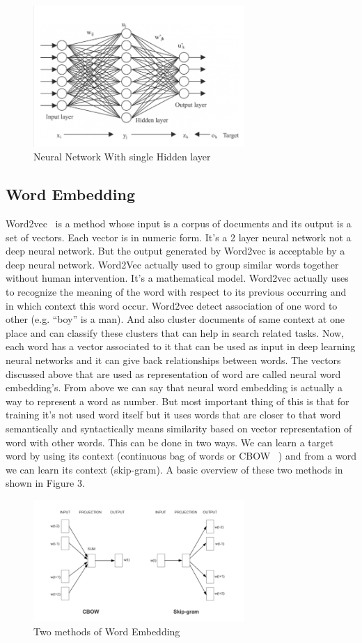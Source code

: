 \documentclass{doublecol-new}
\theoremstyle{TH}{
\newtheorem{lemma}{Lemma}
\newtheorem{theorem}[lemma]{Theorem}
\newtheorem{corrolary}[lemma]{Corrolary}
\newtheorem{conjecture}[lemma]{Conjecture}
\newtheorem{proposition}[lemma]{Proposition}
\newtheorem{claim}[lemma]{Claim}
\newtheorem{stheorem}[lemma]{Wrong Theorem}
\newtheorem{algorithm}{Algorithm}
}
\theoremstyle{THrm}{
\newtheorem{definition}{Definition}[section]
\newtheorem{question}{Question}[section]
\newtheorem{remark}{Remark}
\newtheorem{scheme}{Scheme}
}
\theoremstyle{THhit}{
\newtheorem{case}{Case}[section]
}
\begin{document}
\begin{figure}[h]
	\centerline{\includegraphics[width=8cm,keepaspectratio]{image/nn.PNG}}
	\label{fig:Neural Network}
	\caption{Neural Network With single Hidden layer}
\end{figure}
\subsection{Word Embedding}
Word2vec~\cite{kenter2015short} is a method whose input is a corpus of documents and its output is a set of vectors. Each vector is in numeric form. It’s a 2 layer neural network not a deep neural network. But the output generated by Word2vec is acceptable by a deep neural network. Word2Vec actually used to group similar words together without human intervention. It’s a mathematical model. Word2vec actually uses to recognize the meaning of the word with respect to its previous occurring and in which context this word occur. Word2vec detect association of one word to other (e.g. “boy” is a man). And also cluster documents of same context at one place and can classify these clusters that can help in search related tasks. Now, each word has a vector associated to it that can be used as input in deep learning neural networks and it can give back relationships between words. 
The vectors discussed above that are used as representation of word are called neural word embedding’s.  From above we can say that neural word embedding is actually a way to represent a word as number. But most important thing of this is that for training it’s not used word itself but it uses words that are closer to that word semantically and syntactically means similarity based on vector representation of word with other words. This can be done in two ways. We can learn a target word by using its context (continuous bag of words or CBOW~\cite{mitra2017neural} ) and from a word we can learn its context (skip-gram). A basic overview of these two methods in shown in Figure 3.  


\begin{figure}[h]
	\centerline{\includegraphics[width=8cm,keepaspectratio]{image/word-embeddings.PNG}}
	\label{fig:Two methods of Word Embedding}
	\caption{Two methods of Word Embedding}
\end{figure}
\end{document}
